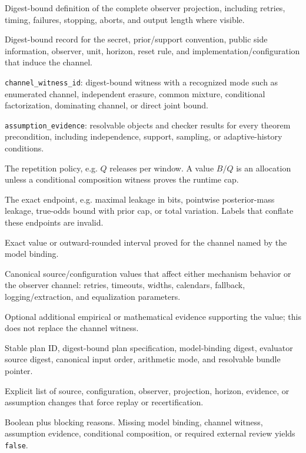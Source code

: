 \documentclass[11pt]{article}
\begin{document}
\begin{description}[style=nextline,leftmargin=1.5em]
\item[\texttt{exposure\_nf\_id}] Digest-bound definition of the complete observer projection, including retries, timing, failures, stopping, aborts, and output length where visible.\cite{series:traceifaces}
\item[\texttt{model\_binding\_id}] Digest-bound record for the secret, prior/support convention, public side information, observer, unit, horizon, reset rule, and implementation/configuration that induce the channel.
\item[Channel witness] \texttt{channel\_witness\_id}: digest-bound witness with a recognized mode such as enumerated channel, independent erasure, common mixture, conditional factorization, dominating channel, or direct joint bound.
\item[Assumption evidence] \texttt{assumption\_evidence}: resolvable objects and checker results for every theorem precondition, including independence, support, sampling, or adaptive-history conditions.
\item[\texttt{usage}] The repetition policy, e.g. \(Q\) releases per window. A value \(B/Q\) is an allocation unless a conditional composition witness proves the runtime cap.\cite{series:bossfightB}
\item[\texttt{budget\_type}] The exact endpoint, e.g. maximal leakage in bits, pointwise posterior-mass leakage, true-odds bound with prior cap, or total variation. Labels that conflate these endpoints are invalid.\cite{series:endpointbridge,series:oddsinflation}
\item[\texttt{budget\_value}] Exact value or outward-rounded interval proved for the channel named by the model binding.
\item[\texttt{knobs}] Canonical source/configuration values that affect either mechanism behavior or the observer channel: retries, timeouts, widths, calendars, fallback, logging/extraction, and equalization parameters.\cite{series:mceq}
\item[\texttt{evidence\_id}] Optional additional empirical or mathematical evidence supporting the value; this does not replace the channel witness.\cite{series:condcert}
\item[\texttt{replay\_hook}] Stable plan ID, digest-bound plan specification, model-binding digest, evaluator source digest, canonical input order, arithmetic mode, and resolvable bundle pointer.\cite{series:contractobjects,series:transparencyprimitives}
\item[\texttt{drift\_invalidators}] Explicit list of source, configuration, observer, projection, horizon, evidence, or assumption changes that force replay or recertification.
\item[\texttt{publication\_eligibility}] Boolean plus blocking reasons. Missing model binding, channel witness, assumption evidence, conditional composition, or required external review yields \texttt{false}.
\end{description}
\end{document}
